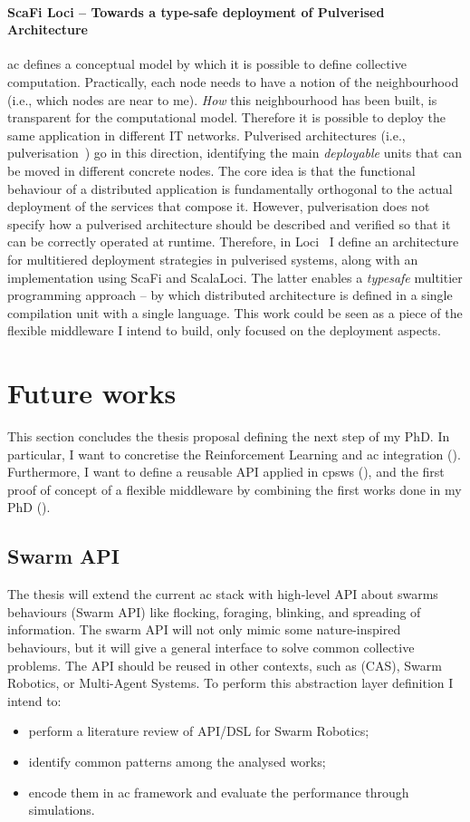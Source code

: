 \documentclass[11pt]{article}
\begin{document}
\paragraph{ScaFi Loci -- Towards a type-safe deployment of Pulverised Architecture}
\ac{ac} defines a conceptual model by which it is possible to define collective computation. Practically, each node needs to have a notion of the neighbourhood (i.e., which nodes are near to me). \textit{How} this neighbourhood has been built, is transparent for the computational model. Therefore it is possible to deploy the same application in different IT networks.
%
Pulverised architectures (i.e., pulverisation~\cite{DBLP:journals/fi/CasadeiPPVW20}) go in this direction, identifying the main \textit{deployable} units that can be moved in different concrete nodes. 
%
The core idea is that the functional behaviour of a distributed application is fundamentally orthogonal to the actual deployment of the services that compose it.
%
However, pulverisation does not specify how a pulverised architecture should
be described and verified so that it can be correctly operated at runtime.
Therefore, in \scafi{} Loci~\cite{DBLP:conf/acsos/AguzziCPSV21} I define an architecture for multitiered deployment strategies in pulverised systems, along with an implementation using ScaFi and ScalaLoci.
%
The latter enables a \textit{typesafe} multitier programming approach -- by which distributed architecture is defined
in a single compilation unit with a single language.
%
This work could be seen as a piece of the flexible middleware I intend to build, only focused on the deployment aspects.

\section{Future works}\label{future}
This section concludes the thesis proposal defining the next step of my PhD. In particular, I want to concretise the Reinforcement Learning and \ac{ac} integration (). Furthermore, I want to define a reusable API applied in \acp{cpsw} (), and the first proof of concept of a flexible middleware by combining the first works done in my PhD (). 
\subsection{Swarm API}\label{swarm-api}
The thesis will extend the current \ac{ac} stack with high-level API about swarms behaviours (Swarm API) like flocking, foraging, blinking, and spreading of information. The swarm API will not only mimic some nature-inspired behaviours, but it will give a general interface to solve common collective problems. The API should be reused in other contexts, such as (CAS), Swarm Robotics, or Multi-Agent Systems.
To perform this abstraction layer definition I intend to:
\begin{itemize}
	\item perform a literature review of API/DSL for Swarm Robotics;
	\item identify common patterns among the analysed works;
	\item encode them in \ac{ac} framework and evaluate the performance through simulations.
\end{itemize}
\end{document}
